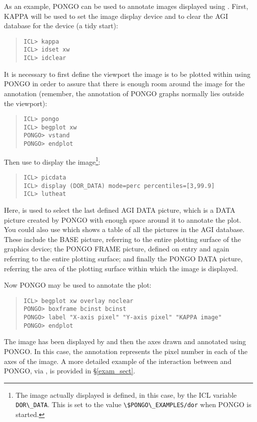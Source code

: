 As an example, PONGO can be used to annotate images displayed using
.  First, KAPPA will be used to set the image
display device and to clear the AGI database for the device (\ie a
tidy start):
\begin{quote}
\begin{verbatim}
ICL> kappa
ICL> idset xw
ICL> idclear
\end{verbatim}
\end{quote}
It is necessary to first define the viewport the image is to be plotted within
using PONGO in order to assure that there is enough room around the image for
the annotation (remember, the annotation of PONGO graphs normally lies outside
the viewport):
\begin{quote}
\begin{verbatim}
ICL> pongo
ICL> begplot xw
PONGO> vstand
PONGO> endplot
\end{verbatim}
\end{quote}
Then use  to display the
image\footnote{The image actually displayed is defined, in this case,
by the ICL variable \verb+DOR\_DATA+. This is set to the value
\verb+\$PONGO\_EXAMPLES/dor+ when PONGO is started.}:
\begin{quote}
\begin{verbatim}
ICL> picdata
ICL> display (DOR_DATA) mode=perc percentiles=[3,99.9]
ICL> lutheat
\end{verbatim}
\end{quote}
Here,  is used to select the last
defined AGI DATA picture, which is a DATA picture created by PONGO
with enough space around it to annotate the plot. You could also use
 which shows a table of all the
pictures in the AGI database.  These include the BASE picture,
referring to the entire plotting surface of the graphics device;
the PONGO FRAME picture, defined on entry and again referring to the
entire plotting surface; and finally the PONGO DATA picture, referring
the area of the plotting surface within which the image is displayed.

Now PONGO may be used to annotate the plot:
\begin{quote}
\begin{verbatim}
ICL> begplot xw overlay noclear
PONGO> boxframe bcinst bcinst
PONGO> label "X-axis pixel" "Y-axis pixel" "KAPPA image"
PONGO> endplot
\end{verbatim}
\end{quote}
The image has been displayed by  and then the
axes drawn and annotated using PONGO.  In this case, the annotation
represents the pixel number in each of the axes of the image.  A more
detailed example of the interaction between  and
PONGO, via , is provided in \S\ref{exam_sect}.

